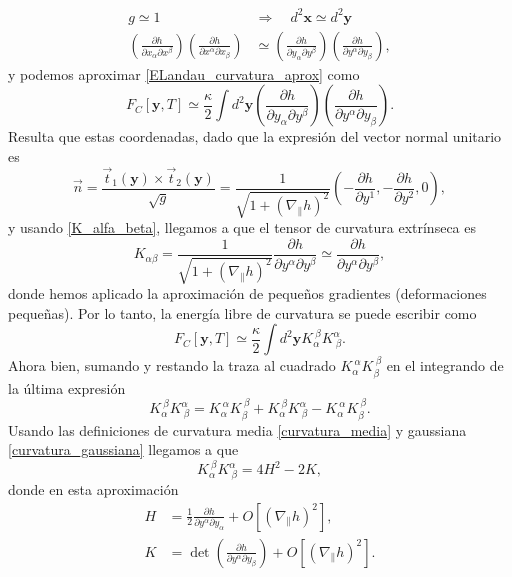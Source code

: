 \begin{align*}
g\simeq 1\quad&\Rightarrow\quad d^2\mathbf{x}\simeq d^2\mathbf{y}\\
\left(\frac{\partial h}{\partial x_{\alpha} \partial x^{\beta}}\right)
\left(\frac{\partial h}{\partial x^{\alpha} \partial x_{\beta}}\right)&\simeq \left(\frac{\partial h}{\partial y_{\alpha} \partial y^{\beta}}\right)
\left(\frac{\partial h}{\partial y^{\alpha} \partial y_{\beta}}\right) ,
\end{align*}
y podemos aproximar \eqref{ELandau_curvatura_aprox} como 
\begin{equation*}
F_C[\mathbf{y},T]\simeq\frac{\kappa}{2}\int d^2\mathbf{y} 
\left(\frac{\partial h}{\partial y_{\alpha} \partial y^{\beta}}\right)
\left(\frac{\partial h}{\partial y^{\alpha} \partial y_{\beta}}\right).
\end{equation*}
Resulta que estas coordenadas, dado que la expresión del vector normal
unitario es
\begin{equation*}
\vec{n}=\frac{\vec{t}_1(\mathbf{y})\times\vec{t}_2(\mathbf{y})}{\sqrt{g}}=\frac{1}{\sqrt{1+\left(\nabla_{\|} h\right)^2}} \left( -\frac{\partial h}{\partial y^1},-\frac{\partial h}{\partial y^2},0\right),
\end{equation*}
y usando \eqref{K_alfa_beta}, llegamos a que el tensor de curvatura extrínseca es
\begin{equation*}
K_{\alpha\beta}=\frac{1}{\sqrt{1+\left(\nabla_{\|} h\right)^2}}\frac{\partial h}{\partial
  y^{\alpha} \partial y^{\beta}}\simeq \frac{\partial h}{\partial
  y^{\alpha} \partial y^{\beta}},
\end{equation*}
donde hemos aplicado la aproximación de pequeños gradientes (deformaciones
pequeñas). Por lo tanto, la energía libre de curvatura \cite{Bowick:Membranes_review} se puede escribir como 
\begin{equation}\label{ELandau_curvatura1}
F_C[\mathbf{y},T]\simeq\frac{\kappa}{2}\int d^2\mathbf{y} K_{\alpha}^{\ \beta}K^{\alpha}_{\ \beta}.
\end{equation} 
Ahora bien, sumando y restando la traza al cuadrado $K_{\alpha}^{\
  \alpha}K_{\beta}^{\ \beta}$ en el integrando de la última expresión
\begin{equation*}
K_{\alpha}^{\ \beta}K^{\alpha}_{\ \beta}=K_{\alpha}^{\ \alpha}K_{\beta}^{\
  \beta}+K_{\alpha}^{\ \beta}K^{\alpha}_{\ \beta}-K_{\alpha}^{\ \alpha}K_{\beta}^{\ \beta}.
\end{equation*}
Usando las definiciones de curvatura media \eqref{curvatura_media} y
gaussiana \eqref{curvatura_gaussiana} llegamos a que
\begin{equation*}
K_{\alpha}^{\ \beta}K^{\alpha}_{\ \beta}=4H^2-2K,
\end{equation*} 
donde en esta aproximación
\begin{align*}
H&=\frac{1}{2}\frac{\partial h}{\partial y^{\alpha} \partial y_{\alpha}}+O\left[\left(\nabla_{\|} h\right)^2\right],\\
K&=\det \left(\frac{\partial h}{\partial y^{\alpha} \partial y_{\beta}}\right)+O\left[\left(\nabla_{\|} h\right)^2\right].
\end{align*}

